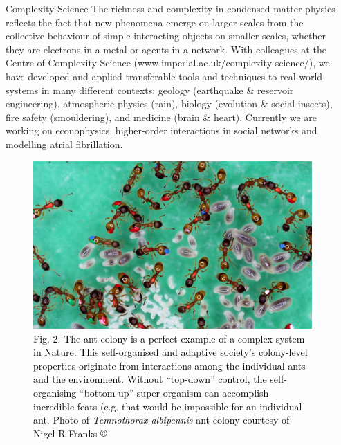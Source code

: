 \documentclass[xcolor={table}]{beamer}
\begin{document}
\begin{frame}[fragile=singleslide,t]
\begin{columns}[onlytextwidth,T]
\begin{column}{.47\textwidth}
\begin{block}{Complexity Science}
The richness and complexity in condensed matter physics reflects the fact that
new phenomena emerge on larger scales from the collective behaviour of simple
interacting objects on smaller scales, whether they are electrons in a metal or agents in a network. With colleagues at the Centre of Complexity Science (www.imperial.ac.uk/complexity-science/), we have developed and applied transferable tools and techniques to real-world systems in many different contexts: geology (earthquake \& reservoir
engineering), atmospheric physics (rain), biology (evolution \& social insects), fire safety (smouldering), and medicine (brain \& heart). Currently we are working on econophysics, higher-order interactions in social networks and modelling atrial fibrillation.
\end{block}
\vspace*{-1.5cm}
\begin{figure}
    \centering
    \includegraphics[width=0.9\columnwidth]{Temnothorax-albipennis-copyright-Nigel-R-Franks.jpg}
    \caption{\footnotesize \textcolor{black}{Fig. 2. The ant colony is a perfect example of a complex system in Nature. This self-organised and adaptive society's colony-level properties originate from interactions among the individual ants and the environment. Without ``top-down'' control, the self-organising ``bottom-up'' super-organism can accomplish incredible feats (e.g. that would be impossible for an individual ant. Photo of {\it \footnotesize  Temnothorax albipennis} ant colony courtesy of Nigel R Franks $\copyright$}}
\end{figure}

\end{column}

\begin{column}{.47\textwidth}


\end{column}
\end{columns}
\end{frame}
\end{document}
